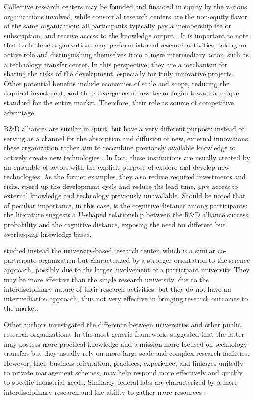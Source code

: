 Collective research centers may be founded and financed in equity by the various organizations involved, while consortial research centers are the non-equity flavor of the same organization: all participants typically pay a membership fee or subscription, and receive access to the knowledge output \citep{Hayton2013}. It is important to note that both these organizations may perform internal research activities, taking an active role and distinguishing themselves from a mere intermediary actor, such as a technology transfer center. In this perspective, they are a mechanism for sharing the risks of the development, especially for truly innovative projects. Other potential benefits include economies of scale and scope, reducing the required investment, and the convergence of new technologies toward a unique standard for the entire market. Therefore, their role as source of competitive advantage.

R\&D alliances are similar in spirit, but have a very different purpose: instead of serving as a channel for the absorption and diffusion of new, external innovations, these organization rather aim to recombine previously available knowledge to actively create new technologies \citep{Lin2012}. In fact, these institutions are usually created by an ensemble of actors with the explicit purpose of explore and develop new technologies. As the former examples, they also reduce required investments and risks, speed up the development cycle and reduce the lead time, give access to external knowledge and technology previously unavailable. Should be noted that of peculiar importance, in this case, is the cognitive distance among participants: the literature suggests a U-shaped relationship between the R\&D alliance success probability and the cognitive distance, exposing the need for different but overlapping knowledge bases.

\citet{Rogers2001} studied instead the university-based research center, which is a similar co-participate organization but characterized by a stronger orientation to the science approach, possibly due to the larger involvement of a participant university. They may be more effective than the single research university, due to the interdisciplinary nature of their research activities, but they do not have an intermediation approach, thus not very effective in bringing research outcomes to the market.

Other authors investigated the difference between universities and other public research organizations. In the most generic framework, \citet{Teirlinck2012} suggested that the latter may possess more practical knowledge and a mission more focused on technology transfer, but they usually rely on more large-scale and complex research facilities. However, their business orientation, practices, experience, and linkages \citep{Debackere2005} unitedly to private management schemes, may help respond more effectively and quickly to specific industrial needs. Similarly, federal labs are characterized by a more interdisciplinary research and the ability to gather more resources \citep{Bozeman2000}.

